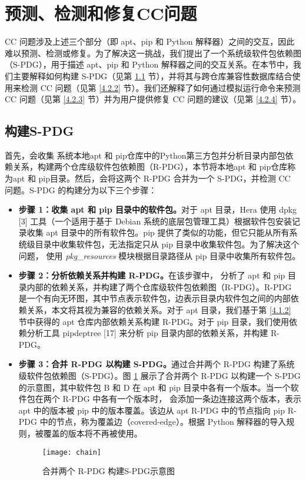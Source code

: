 \section{预测、检测和修复CC问题}\label{4.2}
CC 问题涉及上述三个部分（即 apt、pip 和 Python 解释器）之间的交互，因此难以预测、检测或修复。为了解决这一挑战，我们提出了一个系统级软件包依赖图（S-PDG），用于描述 apt、pip 和 Python 解释器之间的交互关系。在本节中，我们主要解释如何构建 S-PDG（见第 \ref{4.2.1} 节），并将其与跨仓库兼容性数据库结合使用来检测 CC 问题（见第 \ref{4.2.2} 节）。我们还解释了如何通过模拟运行命令来预测 CC 问题（见第 \ref{4.2.3} 节）并为用户提供修复 CC 问题的建议（见第 \ref{4.2.4} 节）。
\subsection{构建S-PDG}\label{4.2.1}
首先，\tool{}会收集 系统本地apt 和 pip仓库中的Python第三方包并分析目录内部包依赖关系，构建两个仓库级软件包依赖图（R-PDG），本节将本地apt 和 pip仓库称为apt 和 pip目录。然后，\tool{}会将这两个 R-PDG 合并为一个 S-PDG，并检测 CC 问题。S-PDG 的构建分为以下三个步骤：
\begin{itemize}
	\item \textbf{步骤 1：收集 apt 和 pip 目录中的软件包。}对于 apt 目录，Hera 使用 dpkg [3] 工具（一个适用于基于 Debian 系统的底层包管理工具）根据软件包安装记录收集 apt 目录中的所有软件包。pip 提供了类似的功能，但它只能从所有系统级目录中收集软件包，无法指定只从 pip 目录中收集软件包。为了解决这个问题，\tool{} 使用 \textit{pkg\_resources} 模块根据目录路径从 pip 目录中收集所有软件包。
	\item \textbf{步骤 2：分析依赖关系并构建 R-PDG。}在该步骤中，\tool{} 分析了 apt 和 pip 目录内部的依赖关系，并构建了两个仓库级软件包依赖图（R-PDG）。R-PDG 是一个有向无环图，其中节点表示软件包，边表示目录内软件包之间的内部依赖关系，本文将其视为兼容的依赖关系。对于 apt 目录，我们基于第 \ref{4.1.2} 节中获得的 apt 仓库内部依赖关系构建 R-PDG。对于 pip 目录，我们使用依赖分析工具 pipdeptree [17] 来分析 pip 目录内部的依赖关系，并构建 R-PDG。
	\item \textbf{步骤 3：合并 R-PDG 以构建 S-PDG。}\tool{}通过合并两个 R-PDG 构建了系统级软件包依赖图（S-PDG）。图 \ref{fig:PDG} 展示了合并两个 R-PDG 以构建一个 S-PDG 的示意图，其中软件包 B 和 D 在 apt 和 pip 目录中各有一个版本。当一个软件包在两个 R-PDG 中各有一个版本时，\tool{} 会添加一条边连接这两个版本，表示 apt 中的版本被 pip 中的版本覆盖。该边从 apt R-PDG 中的节点指向 pip R-PDG 中的节点，称为覆盖边（covered-edge）。根据 Python 解释器的导入规则，被覆盖的版本将不再被使用。
	\begin{figure}[htbp] %
		\centering
		\texttt{[image: chain]}
		\caption{合并两个 R-PDG 构建S-PDG示意图}
		\label{fig:PDG}
	\end{figure}
	
\end{itemize}

